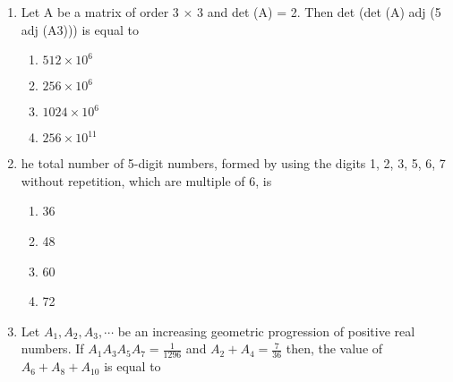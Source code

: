 \documentclass[journal]{IEEEtran}
\numberwithin{equation}{enumi}
\numberwithin{figure}{enumi}
\begin{document}
\begin{enumerate}
    2x + 3y - z = -2\\
    x + y + z = 4\\
    x - y + $|\lambda|$z = 4$\lambda$ - 4\\
    where $\lambda$$\in$ R, has no solution, then \\
    \begin{multicols}{4}
    \begin{enumerate}
        \item $\lambda = 7$
        \item $\lambda = -7$
        \item $\lambda = 8$
        \item $\lambda^2 = 1$
    \end{enumerate} 
    \end{multicols}
    \bigskip
    \item Let A be a matrix of order 3 $\times$ 3 and det (A) = 2. Then det (det (A) adj (5 adj (A3))) is equal to  
    \begin{multicols}{2}
    \begin{enumerate}
        \item $512\times 10^6$
        \item $256\times 10^6$
        \item $1024\times 10^6$
        \item $256\times 10^{11}$
    \end{enumerate} 
    \end{multicols}
    \bigskip
    \item he total number of 5-digit numbers, formed by using the digits 1, 2, 3, 5, 6, 7 without repetition, which are multiple of 6, is 
    \begin{multicols}{4}
    \begin{enumerate}
        \item 36
        \item 48
        \item 60
        \item 72
    \end{enumerate} 
    \end{multicols}
    \bigskip
    \item Let $A_1, A_2, A_3, \cdots $ be an increasing geometric progression of positive real numbers. If $A_1A_3A_5A_7 = \frac{1}{1296}$ and $A_2 + A_4 = \frac{7}{36}$ then, the value of $A_6 + A_8 + A_{10}$ is equal to 
    \begin{multicols}{4}
    \begin{enumerate}

\end{enumerate}
\end{multicols}$$
\end{enumerate}
\end{document}
